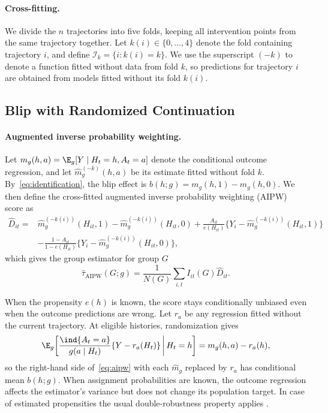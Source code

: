 \paragraph{Cross-fitting.}
We divide the $n$ trajectories into five folds, keeping all intervention points from the same trajectory together.
Let $k(i)\in\{0,\ldots,4\}$ denote the fold containing trajectory $i$, and define $\mathcal I_k=\{i:k(i)=k\}$.
We use the superscript $(-k)$ to denote a function fitted without data from fold $k$, so predictions for trajectory $i$ are obtained from models fitted without its fold $k(i)$.

\subsection{Blip with Randomized Continuation}
\label{app:aipw}

\paragraph{Augmented inverse probability weighting.}
Let $m_g(h,a)=\E_g[Y\mid H_t=h,A_t=a]$ denote the conditional outcome regression, and let $\widehat m_g^{(-k)}(h,a)$ be its estimate fitted without fold $k$.
By~\eqref{eq:identification}, the blip effect is $b(h;g)=m_g(h,1)-m_g(h,0)$.
We then define the cross-fitted augmented inverse probability weighting (AIPW) score as
\begin{align}
    \widehat D_{it}
    ={}&\widehat m_g^{(-k(i))}(H_{it},1)-\widehat m_g^{(-k(i))}(H_{it},0) +\frac{A_{it}}{e(H_{it})}\bigl\{Y_i-\widehat m_g^{(-k(i))}(H_{it},1)\bigr\}\nonumber\\
    &-\frac{1-A_{it}}{1-e(H_{it})}\bigl\{Y_i-\widehat m_g^{(-k(i))}(H_{it},0)\bigr\},
    \label{eq:aipw}
\end{align}
which gives the group estimator for group $G$
$$
    \widehat\tau_{\mathrm{AIPW}}(G;g)=\frac{1}{N(G)}\sum_{i,t}I_{it}(G)\widehat D_{it}.
$$


When the propensity $e(h)$ is known, the score stays conditionally unbiased even when the outcome predictions are
wrong. Let $r_a$ be any regression fitted
without the current trajectory. At eligible histories, randomization gives
\[
    \E_g\!\left[\frac{\ind\{A_t=a\}}{g(a\mid H_t)}\{Y-r_a(H_t)\}\,\middle|\,H_t=h\right]
    =m_g(h,a)-r_a(h),
\]
so the right-hand side of~\eqref{eq:aipw} with each $\widehat m_g$ replaced by
$r_a$ has conditional mean $b(h;g)$.  When assignment probabilities are known, the outcome regression affects the
estimator's variance but does not change its population target. In case of estimated propensities the usual double-robustness
property applies \citep{bang2005dr}.

